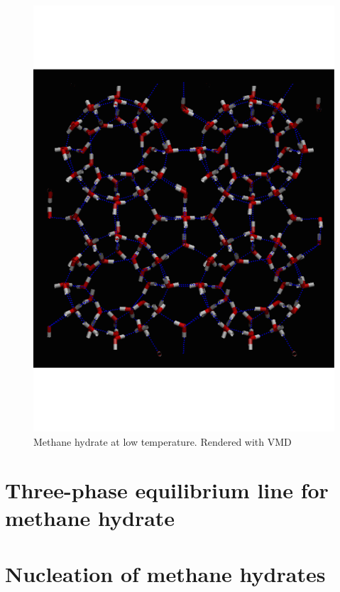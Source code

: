 \begin{figure}
\includegraphics[width=\textwidth]{../snapshots/first_stable_hydrate.pdf}
\caption{Methane hydrate at low temperature. Rendered with VMD}
\label{fig:part2:first_hydrate}
\end{figure}

\section{Three-phase equilibrium line for methane hydrate}


\section{Nucleation of methane hydrates}
